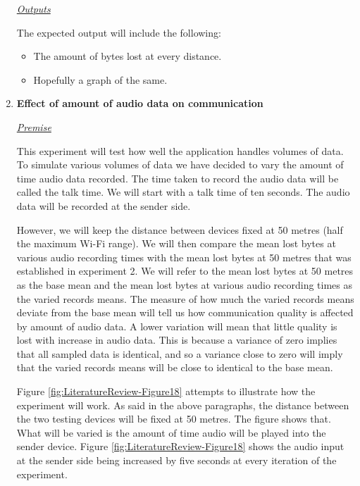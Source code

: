 \documentclass[12pt,svgnames,smaller]{article} %
\begin{document}
\begin{enumerate}
			\emph{\underline{\textsf{Outputs}}}
			
			The expected output will include the following:
			
			\begin{itemize}
				\item The amount of bytes lost at every distance.
				\item Hopefully a graph of the same.
			\end{itemize}
			
			
			\item \textbf{Effect of amount of audio data on communication}
			
			\emph{\underline{\textsf{Premise}}}
			
			This experiment will test how well the application handles volumes of data. 
			To simulate various volumes of data we have decided to vary the amount of time audio data recorded. The time taken to record the audio data will be called the talk time. We will start with a talk time of ten seconds. The audio data will be recorded at the sender side. 
			
			However, we will keep the distance between devices fixed at 50 metres (half the maximum Wi-Fi range). We will then compare the mean lost bytes at various audio recording times with the mean lost bytes at 50 metres that was established in experiment 2. We will refer to the mean lost bytes at 50 metres as the base mean and the mean lost bytes at various audio recording times as the varied records means. The measure of how much the varied records means deviate from the base mean will tell us how communication quality is affected by amount of audio data.
			A lower variation will mean that little quality is lost with increase in audio data. This is because a variance of zero implies that all sampled data is identical, and so a variance close to zero will imply that the varied records means will be close to identical to the base mean.
			
			Figure \ref{fig:LiteratureReview-Figure18} attempts to illustrate how the experiment will work. As said in the above paragraphs, the distance between the two testing devices will be fixed at 50 metres. The figure shows that. What will be varied is the amount of time audio will be played into the sender device. Figure \ref{fig:LiteratureReview-Figure18} shows the audio input at the sender side being increased by five seconds at every iteration of the experiment. 
			

\end{enumerate}
\end{document}
